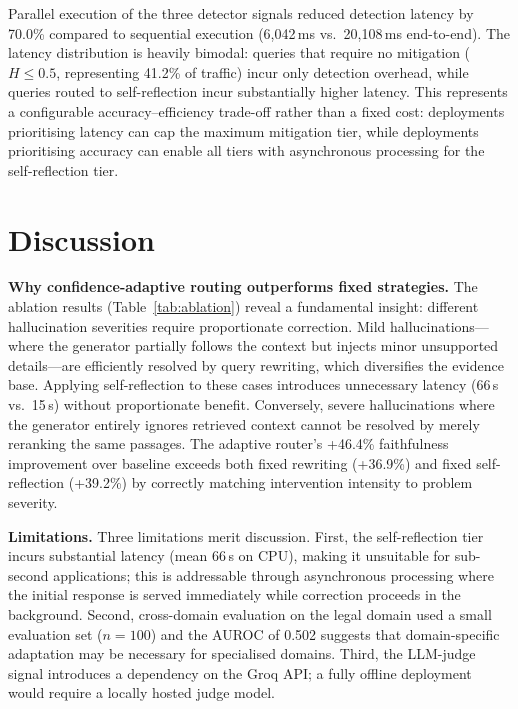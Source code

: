 \documentclass[conference]{IEEEtran}
\begin{document}
Parallel execution of the three detector signals reduced detection latency by 70.0\% compared to sequential execution (6{,}042\,ms vs.\ 20{,}108\,ms end-to-end). The latency distribution is heavily bimodal: queries that require no mitigation ($H \leq 0.5$, representing 41.2\% of traffic) incur only detection overhead, while queries routed to self-reflection incur substantially higher latency. This represents a configurable accuracy--efficiency trade-off rather than a fixed cost: deployments prioritising latency can cap the maximum mitigation tier, while deployments prioritising accuracy can enable all tiers with asynchronous processing for the self-reflection tier.

\section{Discussion}

\textbf{Why confidence-adaptive routing outperforms fixed strategies.} The ablation results (Table~\ref{tab:ablation}) reveal a fundamental insight: different hallucination severities require proportionate correction. Mild hallucinations---where the generator partially follows the context but injects minor unsupported details---are efficiently resolved by query rewriting, which diversifies the evidence base. Applying self-reflection to these cases introduces unnecessary latency (66\,s vs.\ 15\,s) without proportionate benefit. Conversely, severe hallucinations where the generator entirely ignores retrieved context cannot be resolved by merely reranking the same passages. The adaptive router's +46.4\% faithfulness improvement over baseline exceeds both fixed rewriting (+36.9\%) and fixed self-reflection (+39.2\%) by correctly matching intervention intensity to problem severity.

\textbf{Limitations.} Three limitations merit discussion. First, the self-reflection tier incurs substantial latency (mean 66\,s on CPU), making it unsuitable for sub-second applications; this is addressable through asynchronous processing where the initial response is served immediately while correction proceeds in the background. Second, cross-domain evaluation on the legal domain used a small evaluation set ($n=100$) and the AUROC of 0.502 suggests that domain-specific adaptation may be necessary for specialised domains. Third, the LLM-judge signal introduces a dependency on the Groq API; a fully offline deployment would require a locally hosted judge model.
\end{document}
